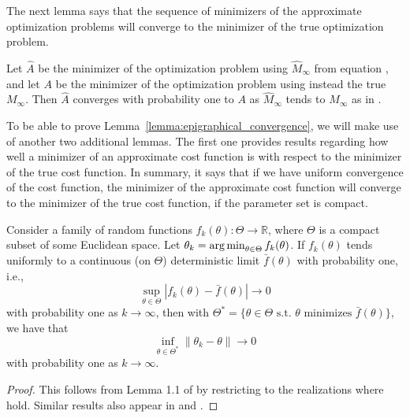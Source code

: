 \documentclass[journal]{IEEEtran}
\begin{document}
The next lemma says that the sequence of minimizers of the approximate
optimization problems will converge to the minimizer of the true optimization
problem.
\begin{lemma}
    Let $\hat A$ be the minimizer of the optimization problem
     using $\hat M_\infty$ from equation
    , and let $A$ be the minimizer of the optimization problem
     using instead the true $M_\infty$.
    Then $\hat A$ converges with probability one to $A$ as $\hat M_\infty$ tends to
    $M_\infty$ as in .
    \label{lemma:epigraphical_convergence}
\end{lemma}
To be able to prove Lemma~\ref{lemma:epigraphical_convergence}, we will make
use of another two additional lemmas. The first one provides results regarding
how well a minimizer of an approximate cost function is with respect to the
minimizer of the true cost function. In summary, it says that if we have
uniform convergence of the cost function, the minimizer of the approximate cost
function will converge to the minimizer of the true cost function, if the
parameter set is compact.
\begin{lemma}
    Consider a family of random functions $f_k(\theta) : \Theta \to \mathbb{R}$, where
    $\Theta$ is a compact subset of some Euclidean space. Let $\theta_k
    = \operatorname*{arg\,min}_{\theta \in \Theta} f_k(\theta)$. If $f_k(\theta)$ tends
    uniformly to a continuous (on $\Theta$) deterministic limit $\bar
    f(\theta)$ with probability one, i.e.,
    \begin{equation}
        \sup_{\theta \in \Theta} | f_k(\theta) - \bar f(\theta) | \to 0
        \label{eq:limit_assumption}
    \end{equation}
    with probability one as $k \to \infty$, then with $\Theta^* = \{ \theta \in \Theta \text{ s.t. } \theta
            \text{ minimizes } \bar f(\theta) \}$, we have that
            \begin{equation}
                \inf_{\theta \in \Theta^*} \| \theta_k - \theta \| \to 0
            \end{equation}
            with probability one as $k \to \infty$.
    \label{lemma:convergence_minimizers}
\end{lemma}
\begin{proof}
    This follows from Lemma 1.1 of \cite{campi_system_2006} by restricting to
    the realizations where  hold. Similar results also appear in
    \cite{pollard_asymptotics_1993} and \cite[Ch. 24]{gourieroux_statistics_1995}.
\end{proof}
\end{document}
